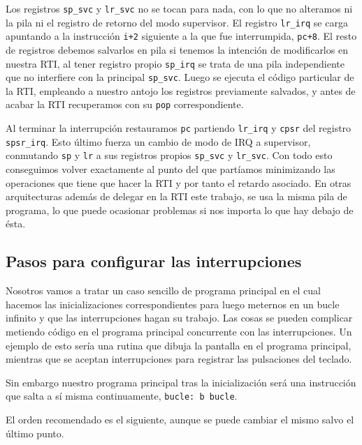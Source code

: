 Los registros {\tt sp\_svc} y {\tt lr\_svc} no se tocan para nada, con lo que no alteramos ni la
pila ni el registro de retorno del modo supervisor. El registro {\tt lr\_irq} se carga apuntando a la
instrucción {\tt i+2} siguiente a la que fue interrumpida, {\tt pc+8}. El resto de registros debemos salvarlos en pila si tenemos la intención
de modificarlos en nuestra RTI, al tener registro propio {\tt sp\_irq} se trata de una pila
independiente que no interfiere con la principal {\tt sp\_svc}. Luego se ejecuta el código
particular de la RTI, empleando a nuestro antojo los registros previamente salvados, y antes de
acabar la RTI recuperamos con su {\tt pop} correspondiente.

Al terminar la interrupción restauramos {\tt pc} partiendo {\tt lr\_irq} y {\tt cpsr} del registro
{\tt spsr\_irq}. Esto último fuerza un cambio de modo de IRQ a supervisor, conmutando {\tt sp} y {\tt lr}
a sus registros propios {\tt sp\_svc} y {\tt lr\_svc}. Con todo esto conseguimos volver exactamente
al punto del que partíamos minimizando las
operaciones que tiene que hacer la RTI y por tanto el retardo asociado. En otras arquitecturas
además de delegar en la RTI este trabajo, se usa la misma pila de programa, lo que puede
ocasionar problemas si nos importa lo que hay debajo de ésta.

\subsection{Pasos para configurar las interrupciones}

Nosotros vamos a tratar un caso sencillo de programa principal en el cual hacemos las
inicializaciones correspondientes para luego meternos en un bucle infinito y que las
interrupciones hagan su trabajo. Las cosas se pueden complicar metiendo código en
el programa principal concurrente con las interrupciones. Un ejemplo de esto sería
una rutina que dibuja la pantalla en el programa principal, mientras que se aceptan
interrupciones para registrar las pulsaciones del teclado.

Sin embargo nuestro programa principal tras la inicialización será una
instrucción que salta a sí misma continuamente, {\tt bucle: b bucle}.

El orden recomendado es el siguiente, aunque se puede cambiar el mismo salvo el último punto.

